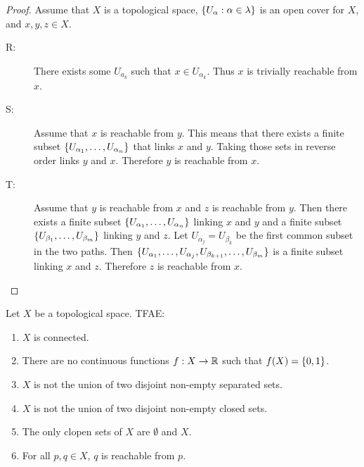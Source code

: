 \documentclass[letterpaper,12pt,fleqn]{article}
\renewcommand{\a}{\alpha}
\renewcommand{\b}{\beta}
\renewcommand{\l}{\lambda}
\begin{document}
\begin{proof}
  Assume that \(X\) is a topological space, \(\set{U_{\a}:\a\in\l}\) is an open cover for \(X\), and
  \(x,y,z\in X\).
  \begin{description}
  \item[R:] There exists some \(U_{a_k}\) such that \(x\in U_{\a_k}\).  Thus \(x\) is trivially reachable from
    \(x\).

  \item[S:] Assume that \(x\) is reachable from \(y\).  This means that there exists a finite subset
    \(\set{U_{\a_1},\ldots,U_{\a_n}}\) that links \(x\) and \(y\).  Taking those sets in reverse order links
    \(y\) and \(x\).  Therefore \(y\) is reachable from \(x\).

  \item[T:] Assume that \(y\) is reachable from \(x\) and \(z\) is reachable from \(y\).  Then there exists
    a finite subset \(\set{U_{\a_1},\ldots,U_{\a_n}}\) linking \(x\) and \(y\) and a finite subset
    \(\set{U_{\b_1},\ldots,U_{\b_m}}\) linking \(y\) and \(z\).  Let \(U_{\a_j}=U_{\b_k}\) be the first common
    subset in the two paths.  Then \(\set{U_{\a_1},\ldots,U_{\a_j},U_{\b_{k+1}},\ldots,U_{\b_m}}\) is a finite
    subset linking \(x\) and \(z\).  Therefore \(z\) is reachable from \(x\).
  \end{description}
\end{proof}

\begin{theorem}
  Let \(X\) be a topological space.  TFAE:
  \begin{enumerate}
  \item \(X\) is connected.
  \item There are no continuous functions \(f:X\to\mathbb{R}\) such that \(f(X)=\{0,1\}\).
  \item \(X\) is not the union of two disjoint non-empty separated sets.
  \item \(X\) is not the union of two disjoint non-empty closed sets.
  \item The only clopen sets of \(X\) are \(\emptyset\) and \(X\).
  \item For all \(p,q\in X\), \(q\) is reachable from \(p\).
  \end{enumerate}
\end{theorem}
\end{document}
